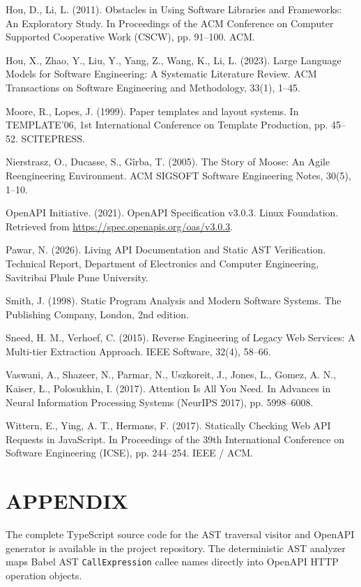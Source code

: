 \documentclass[a4paper,10pt]{article}
\begin{document}
\hangindent=0.5cm
Hou, D., Li, L. (2011). Obstacles in Using Software Libraries and Frameworks: An Exploratory Study. In Proceedings of the ACM Conference on Computer Supported Cooperative Work (CSCW), pp. 91--100. ACM.\par
\hangindent=0.5cm
Hou, X., Zhao, Y., Liu, Y., Yang, Z., Wang, K., Li, L. (2023). Large Language Models for Software Engineering: A Systematic Literature Review. ACM Transactions on Software Engineering and Methodology, 33(1), 1--45.\par
\hangindent=0.5cm
Moore, R., Lopes, J. (1999). Paper templates and layout systems. In TEMPLATE’06, 1st International Conference on Template Production, pp. 45--52. SCITEPRESS.\par
\hangindent=0.5cm
Nierstrasz, O., Ducasse, S., G\^{i}rba, T. (2005). The Story of Moose: An Agile Reengineering Environment. ACM SIGSOFT Software Engineering Notes, 30(5), 1--10.\par
\hangindent=0.5cm
OpenAPI Initiative. (2021). OpenAPI Specification v3.0.3. Linux Foundation. Retrieved from \url{https://spec.openapis.org/oas/v3.0.3}.\par
\hangindent=0.5cm
Pawar, N. (2026). Living API Documentation and Static AST Verification. Technical Report, Department of Electronics and Computer Engineering, Savitribai Phule Pune University.\par
\hangindent=0.5cm
Smith, J. (1998). Static Program Analysis and Modern Software Systems. The Publishing Company, London, 2nd edition.\par
\hangindent=0.5cm
Sneed, H. M., Verhoef, C. (2015). Reverse Engineering of Legacy Web Services: A Multi-tier Extraction Approach. IEEE Software, 32(4), 58--66.\par
\hangindent=0.5cm
Vaswani, A., Shazeer, N., Parmar, N., Uszkoreit, J., Jones, L., Gomez, A. N., Kaiser, \L., Polosukhin, I. (2017). Attention Is All You Need. In Advances in Neural Information Processing Systems (NeurIPS 2017), pp. 5998--6008.\par
\hangindent=0.5cm
Wittern, E., Ying, A. T., Hermans, F. (2017). Statically Checking Web API Requests in JavaScript. In Proceedings of the 39th International Conference on Software Engineering (ICSE), pp. 244--254. IEEE / ACM.\par

\section*{APPENDIX}
\noindent
The complete TypeScript source code for the AST traversal visitor and OpenAPI generator is available in the project repository. The deterministic AST analyzer maps Babel AST \texttt{CallExpression} callee names directly into OpenAPI HTTP operation objects.
\end{document}
